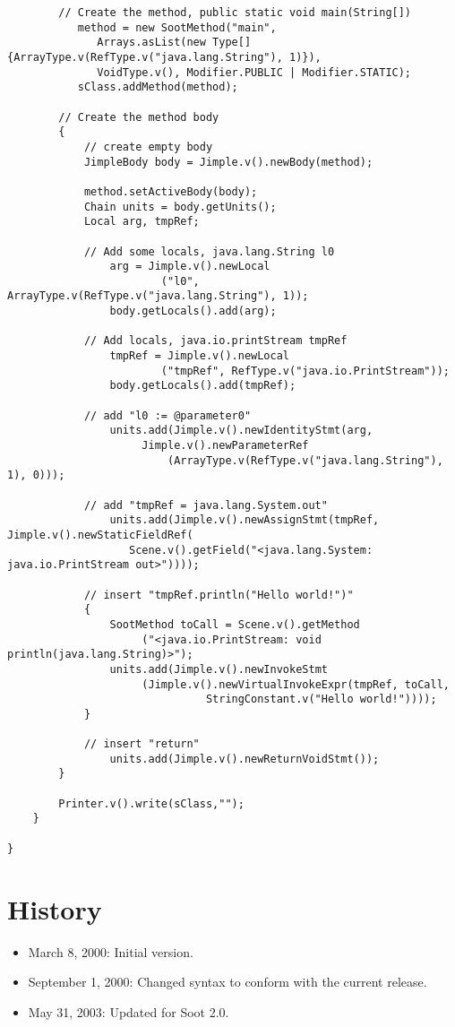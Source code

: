 \documentclass{article}
\begin{document}
\begin{verbatim}
        // Create the method, public static void main(String[])
           method = new SootMethod("main",
              Arrays.asList(new Type[] {ArrayType.v(RefType.v("java.lang.String"), 1)}),
              VoidType.v(), Modifier.PUBLIC | Modifier.STATIC);
           sClass.addMethod(method);
           
        // Create the method body
        {
            // create empty body
            JimpleBody body = Jimple.v().newBody(method);
            
            method.setActiveBody(body);
            Chain units = body.getUnits();
            Local arg, tmpRef;
            
            // Add some locals, java.lang.String l0
                arg = Jimple.v().newLocal
                        ("l0", ArrayType.v(RefType.v("java.lang.String"), 1));
                body.getLocals().add(arg);
            
            // Add locals, java.io.printStream tmpRef
                tmpRef = Jimple.v().newLocal
                        ("tmpRef", RefType.v("java.io.PrintStream"));
                body.getLocals().add(tmpRef);
                
            // add "l0 := @parameter0"
                units.add(Jimple.v().newIdentityStmt(arg, 
                     Jimple.v().newParameterRef
                         (ArrayType.v(RefType.v("java.lang.String"), 1), 0)));
            
            // add "tmpRef = java.lang.System.out"
                units.add(Jimple.v().newAssignStmt(tmpRef, Jimple.v().newStaticFieldRef(
                   Scene.v().getField("<java.lang.System: java.io.PrintStream out>"))));
            
            // insert "tmpRef.println("Hello world!")"
            {
                SootMethod toCall = Scene.v().getMethod
                     ("<java.io.PrintStream: void println(java.lang.String)>");
                units.add(Jimple.v().newInvokeStmt
                     (Jimple.v().newVirtualInvokeExpr(tmpRef, toCall, 
                               StringConstant.v("Hello world!"))));
            }                        
            
            // insert "return"
                units.add(Jimple.v().newReturnVoidStmt());
        }

        Printer.v().write(sClass,"");
    }
        
}
\end{verbatim}

\section{History}
\begin{itemize}
\item March 8, 2000: Initial version.
\item September 1, 2000: Changed syntax to conform with the current release.
\item May 31, 2003: Updated for Soot 2.0.
\end{itemize}
\end{document}
